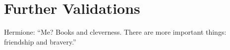 \chapter{Further Validations}
\label{c:further-vali}

Hermione: ``Me? Books and cleverness. There are more important things: friendship and bravery.''

